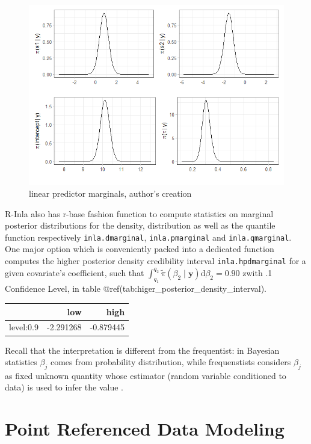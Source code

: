 \documentclass[
  12pt,
  a4paper,
  oneside]{book}
\theoremstyle{definition}
\theoremstyle{definition}
\theoremstyle{definition}
\theoremstyle{remark}
\begin{document}
\begin{figure}
\centering
\includegraphics{images/marginal_distr.png}
\caption{linear predictor marginals, author's creation}
\end{figure}

R-Inla also has r-base fashion function to compute statistics on marginal posterior distributions for the density, distribution as well as the quantile function respectively \texttt{inla.dmarginal}, \texttt{inla.pmarginal} and \texttt{inla.qmarginal}. One major option which is conveniently packed into a dedicated function computes the higher posterior density credibility interval \texttt{inla.hpdmarginal} for a given covariate's coefficient, such that \(\int_{q_{1}}^{q_{2}} \tilde{\pi}\left(\beta_{2} \mid \boldsymbol{y}\right) \mathrm{d} \beta_{2}=0.90\) zwith .1 Confidence Level, in table @ref(tab:higer\_posterior\_density\_interval).

\begin{tabular}{lrr}
\toprule
  & low & high\\
\midrule
level:0.9 & -2.291268 & -0.879445\\
\bottomrule
\end{tabular}

Recall that the interpretation is different from the frequentist: in Bayesian statistics \(\beta_{j}\) comes from probability distribution, while frequenstists considers \(\beta_{j}\) as fixed unknown quantity whose estimator (random variable conditioned to data) is used to infer the value \citeyearpar{Blangiardo-Cameletti}.

\hypertarget{prdm}{%
\chapter{Point Referenced Data Modeling}\label{prdm}}
\end{document}
